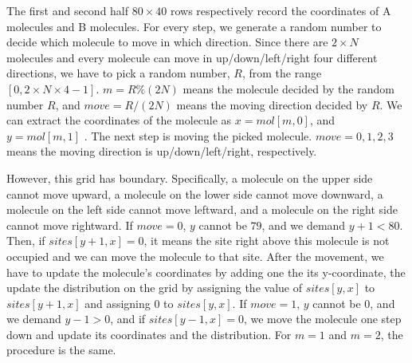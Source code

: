 \documentclass{article}
\begin{document}
The first and second half $80\times 40$ rows respectively record the coordinates of A molecules
and B molecules. For every step, we generate a random number to decide which
molecule to move in which direction. Since there are $2\times N$ molecules
and every molecule can move in up/down/left/right four different directions,
we have to pick a random number, $R$, from the range $\left[ 0,2\times
N\times 4-1\right] $. $m=R\%(2N)$ means the molecule decided by the random
number $R$, and $move=R/(2N)$ means the moving direction decided by $R$. We
can extract the coordinates of the molecule as $x=mol[m,0]$, and $y=mol[m,1]$%
. The next step is moving the picked molecule. $move=0,1,2,3$ means the
moving direction is up/down/left/right, respectively.

 However, this grid has
boundary. Specifically, a molecule on the upper side cannot move upward, a
molecule on the lower side cannot move downward, a molecule on the left side
cannot move leftward, and a molecule on the right side cannot move
rightward. If $move=0$, $y$ cannot be $79$, and we demand $y+1<80$. Then, if
$sites[y+1,x]=0$, it means the site right above this molecule is not
occupied and we can move the molecule to that site. After the movement, we
have to update the molecule's coordinates by adding one the its
y-coordinate, the update the distribution on the grid by assigning the value
of $sites[y,x]$ to $sites[y+1,x]$ and assigning $0$ to $sites[y,x]$. If $%
move=1$, $y$ cannot be $0$, and we demand $y-1>0$, and if $sites[y-1,x]=0$,
we move the molecule one step down and update its coordinates and the
distribution. For $m=1$ and $m=2$, the procedure is the same.
\end{document}

